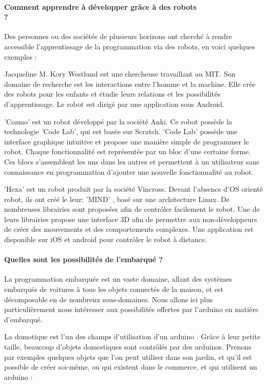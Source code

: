 \documentclass[12pt,francais]{report}
\begin{document}
\paragraph*{Comment apprendre à développer grâce à des robots \\?}

Des personnes ou des sociétés de plusieurs horizons ont cherché à rendre accessible l'apprentissage de la programmation via des robots, en voici quelques exemples :

Jacqueline M. Kory Westlund est une chercheuse travaillant au MIT. Son domaine de recherche est les interactions entre l'homme et la machine.
Elle crée des robots pour les enfants et étudie leurs relations et les possibilités d'apprentissage.\cite{ref9}
Le robot est dirigé par une application sous Android.

'Cozmo' est un robot développé par la société Anki. Ce robot possède la technologie 'Code Lab', qui est basée sur Scratch.\cite{ref10} 
'Code Lab' possède une interface graphique intuitive et propose une manière simple de programmer le robot.
Chaque fonctionnalité est représentée par un bloc d'une certaine forme.
Ces blocs s'assemblent les uns dans les autres et permettent à un utilisateur sans connaissance en programmation d'ajouter une nouvelle fonctionnalité au robot.

'Hexa' est un robot produit par la société Vincross. Devant l'absence d'OS orienté robot, ils ont créé le leur: 'MIND' \cite{ref11},
basé sur une architecture Linux. De nombreuses librairies sont proposées afin de contrôler facilement le robot.
Une de leurs librairies propose une interface 3D afin de permettre aux non-développeurs de créer des mouvements et des comportements complexes.
Une application est disponible sur iOS et android pour contrôler le robot à distance.

\paragraph*{Quelles sont les possibilités de l'embarqué ?\\}

La programmation embarquée est un vaste domaine, allant des systèmes embarqués de voitures à tous les objets connectés de la maison, et est décomposable en de nombreux sous-domaines. Nous allons ici plus particulièrement nous intéresser aux possibilités offertes par l'arduino en matière d'embarqué.

La domotique est l'un des champs d'utilisation d'un arduino \cite{ref20}. Grâce à leur petite taille, beaucoup d'objets domestiques sont contrôlés par des arduinos. Prenons par exemples quelques objets que l'on peut utiliser dans son jardin, et qu'il est possible de créer soi-même, ou qui existent dans le commerce, et qui utilisent un arduino \cite{ref21}: 
\end{document}
